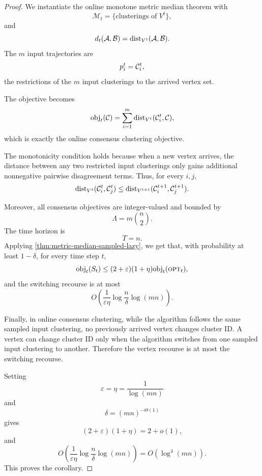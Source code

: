 \begin{proof}
We instantiate the online monotone metric median theorem with
\[
    \mathcal M_t=\{\text{clusterings of }V^t\},
\]
and
\[
    d_t(\mathcal{A},\mathcal{B})=\text{dist}_{V^t}(\mathcal{A},\mathcal{B}).
\]
The \(m\) input trajectories are
\[
    p_i^t=\mathcal{C}_i^t,
\]
the restrictions of the \(m\) input clusterings to the arrived vertex set.

The objective becomes
\[
    \text{obj}_t(\mathcal{C})
    =
    \sum_{i=1}^m
    \text{dist}_{V^t}(\mathcal{C}_i^t,\mathcal{C}),
\]
which is exactly the online consensus clustering objective.

The monotonicity condition holds because when a new vertex arrives, the distance between any two restricted input clusterings only gains additional nonnegative pairwise disagreement terms. Thus, for every \(i,j\),
\[
    \text{dist}_{V^t}(\mathcal{C}_i^t,\mathcal{C}_j^t)
    \le
    \text{dist}_{V^{t+1}}(\mathcal{C}_i^{t+1},\mathcal{C}_j^{t+1}).
\]

Moreover, all consensus objectives are integer-valued and bounded by
\[
    \Lambda
    =
    m\binom n2.
\]
The time horizon is
\[
    T=n.
\]
Applying \cref{thm:metric-median-sampled-lazy}, we get that, with probability at least \(1-\delta\), for every time step \(t\),
\[
    \text{obj}_t(S_t)
    \le
    (2+\varepsilon)(1+\eta)\text{obj}_t(\textsc{opt}_t),
\]
and the switching recourse is at most
\[
    O\left(
        \frac{1}{\varepsilon\eta}
        \log\frac{n}{\delta}
        \log(mn)
    \right).
\]

Finally, in online consensus clustering, while the algorithm follows the same sampled input clustering, no previously arrived vertex changes cluster ID. A vertex can change cluster ID only when the algorithm switches from one sampled input clustering to another. Therefore the vertex recourse is at most the switching recourse.

Setting
\[
    \varepsilon=\eta=\frac{1}{\log(mn)}
\]
and
\[
    \delta=(mn)^{-\Theta(1)}
\]
gives
\[
    (2+\varepsilon)(1+\eta)
    =
    2+o(1),
\]
and
\[
    O\left(
        \frac{1}{\varepsilon\eta}
        \log\frac{n}{\delta}
        \log(mn)
    \right)
    =
    O(\log^4(mn)).
\]
This proves the corollary.
\end{proof}